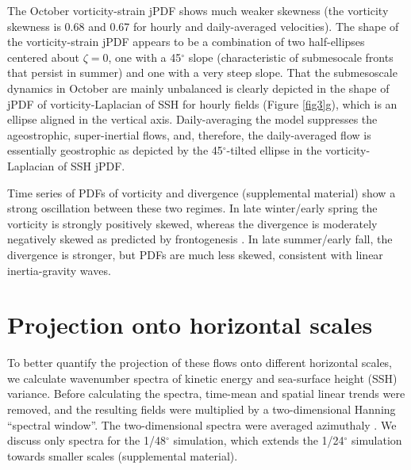 \documentclass[grl]{agutex2015}
\begin{document}
\begin{article}
The October vorticity-strain jPDF shows much weaker skewness (the vorticity skewness
is 0.68 and 0.67 for hourly and daily-averaged velocities). The shape of the
vorticity-strain jPDF  appears to be a combination of two half-ellipses centered
about $\zeta=0$, one with a 45$^\circ$ slope (characteristic of submesocale fronts
that persist in summer) and one with a very steep slope.
That the submesoscale dynamics in October are mainly unbalanced is clearly depicted
in the shape of jPDF of vorticity-Laplacian of SSH for hourly fields
 (Figure \ref{fig3}g), which is an ellipse aligned in the vertical axis.
Daily-averaging the model suppresses the ageostrophic, super-inertial flows, and, therefore,
the daily-averaged flow is essentially geostrophic as depicted by the 45$^\circ$-tilted
ellipse in the vorticity-Laplacian of SSH jPDF.

 Time series of PDFs of vorticity and divergence (supplemental material) show
 a strong oscillation between these two regimes. In late winter/early spring
 the vorticity is strongly positively skewed, whereas the divergence is moderately
 negatively skewed as predicted by frontogenesis \citep[e.g., ][]{capet_etal2008a,mcwilliams2016}
. In late summer/early fall, the divergence is stronger, but PDFs are much less skewed,
consistent with linear inertia-gravity waves.

\section{Projection onto horizontal scales}

To better quantify the projection of these flows onto different horizontal
scales, we calculate wavenumber spectra of kinetic energy and sea-surface height
(SSH) variance.  Before calculating the spectra, time-mean and spatial linear
trends were removed, and the resulting fields were multiplied by a two-dimensional Hanning ``spectral window''.
The two-dimensional spectra were averaged azimuthaly \citep[e.g., ][]{rocha_etal2016} .
We discuss only spectra for the 1/48$^\circ$ simulation, which extends the 1/24$^\circ$ simulation
towards smaller scales (supplemental material).




\end{article}
\end{document}
